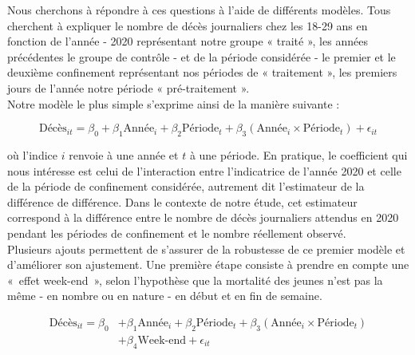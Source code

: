 \documentclass[titlepage]{article}
\begin{document}

Nous cherchons à répondre à ces questions à l'aide de différents modèles. Tous cherchent à expliquer le nombre de décès journaliers chez les 18-29 ans en fonction de l'année - 2020 représentant notre groupe « traité », les années précédentes le groupe de contrôle - et de la période considérée - le premier et le deuxième confinement représentant nos périodes de « traitement », les premiers jours de l'année notre période « pré-traitement ». \\

Notre modèle le plus simple s'exprime ainsi de la manière suivante : 

\begin{equation}
\mathrm{Décès}_{it} = \beta_0 + \beta_1 \mathrm{Année}_i + \beta_2 \mathrm{Période}_t + \beta_3 (\mathrm{Année}_i \times \mathrm{Période}_t) + \epsilon_{it}
\end{equation}

où l'indice $i$ renvoie à une année et $t$ à une période. En pratique, le coefficient qui nous intéresse est celui de l'interaction entre l'indicatrice de l'année 2020 et celle de la période de confinement considérée, autrement dit l'estimateur de la différence de différence. Dans le contexte de notre étude, cet estimateur correspond à la différence entre le nombre de décès journaliers attendus en 2020 pendant les périodes de confinement et le nombre réellement observé. \\

Plusieurs ajouts permettent de s'assurer de la robustesse de ce premier modèle et d'améliorer son ajustement. Une première étape consiste à prendre en compte une « effet week-end », selon l'hypothèse que la mortalité des jeunes n'est pas la même - en nombre ou en nature - en début et en fin de semaine.  

\begin{equation}
\begin{aligned}
  \textrm{Décès}_{it} = \beta_0 &+ \beta_1 \textrm{Année}_i + \beta_2 \textrm{Période}_t + \beta_3 (\textrm{Année}_i \times \textrm{Période}_t)\\
   &+ \beta_4 \textrm{Week-end} + \epsilon_{it}
\end{aligned}
\end{equation}
\end{document}
